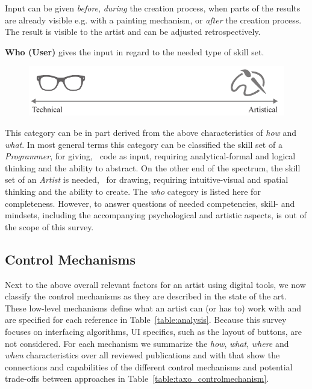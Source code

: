 Input can be given \textit{before}, \textit{during} the creation process, when parts of the results are already visible e.g. with a painting mechanism, or \textit{after} the creation process. The result is visible to the artist and can be adjusted retrospectively.


\noindent\textbf{Who (User)} gives the input in regard to the needed type of skill set. 
\begin{figure}[H]
    \centering
        \includegraphics[width=\controlParamsFigWidth\linewidth]{figures/control_paradigms/who.pdf}
\end{figure}

This category can be in part derived from the above characteristics of \textit{how} and \textit{what}. In most general terms this category can be classified the skill set of a \textit{Programmer}, for giving, \eg~code as input, requiring analytical-formal and logical thinking and the ability to abstract. On the other end of the spectrum, the skill set of an \textit{Artist} is needed, \eg~for drawing, requiring intuitive-visual and spatial thinking and the ability to create. The \textit{who} category is listed here for completeness. However, to answer questions of needed competencies, skill- and mindsets, including the accompanying psychological and artistic aspects, is out of the scope of this survey.

\subsection{Control Mechanisms}\label{subsec:taxo_control_mechanism}
Next to the above overall relevant factors for an artist using digital tools, we now classify the control mechanisms as they are described in the state of the art. These low-level mechanisms define what an artist can (or has to) work with and are specified for each reference in Table~\ref{table:analysis}. Because this survey focuses on interfacing algorithms, UI specifics, such as the layout of buttons, are not considered. For each mechanism we summarize the \textit{how}, \textit{what}, \textit{where} and \textit{when} characteristics over all reviewed publications and with that show the connections and capabilities of the different control mechanisms and potential trade-offs between approaches in Table~\ref{table:taxo_controlmechanism}.


